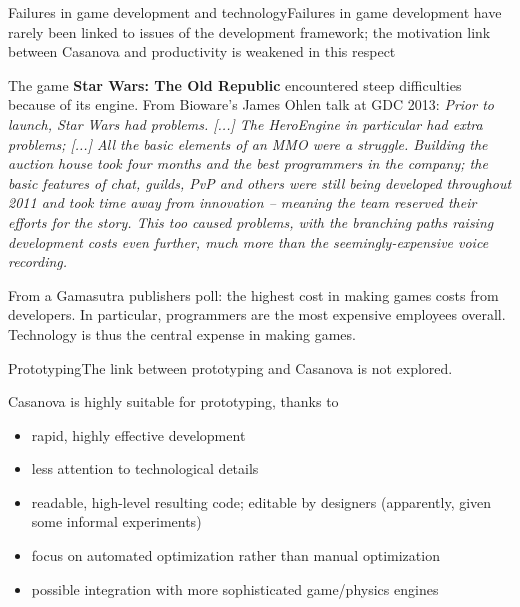 \documentclass{beamer}
\begin{document}
\begin{slide}{Failures in game development and technology}{Failures in game development have rarely been linked to issues of the development framework; the motivation link between Casanova and productivity is weakened in this respect}{
\fontsize{8}{10}\selectfont
\item The game \textbf{Star Wars: The Old Republic} encountered steep difficulties because of its engine. From Bioware’s James Ohlen talk at GDC 2013:
\textit{Prior to launch, Star Wars had problems. [...] The HeroEngine in particular had extra problems; [...]
All the basic elements of an MMO were a struggle. Building the auction house took four months and the best programmers in the company; the basic features of chat, guilds, PvP and others were still being developed throughout 2011 and took time away from innovation – meaning the team reserved their efforts for the story. This too caused problems, with the branching paths raising development costs even further, much more than the seemingly-expensive voice recording.}
\item From a Gamasutra publishers poll: the highest cost in making games costs from developers. In particular, programmers are the most expensive employees overall. Technology is thus the central expense in making games.
}\end{slide}

\begin{slide}{Prototyping}{The link between prototyping and Casanova is not explored.}{
\item Casanova is highly suitable for prototyping, thanks to
\begin{itemize}
\item rapid, highly effective development
\item less attention to technological details
\item readable, high-level resulting code; editable by designers (apparently, given some informal experiments)
\item focus on automated optimization rather than manual optimization
\item possible integration with more sophisticated game/physics engines
\end{itemize}
}\end{slide}
\end{document}
